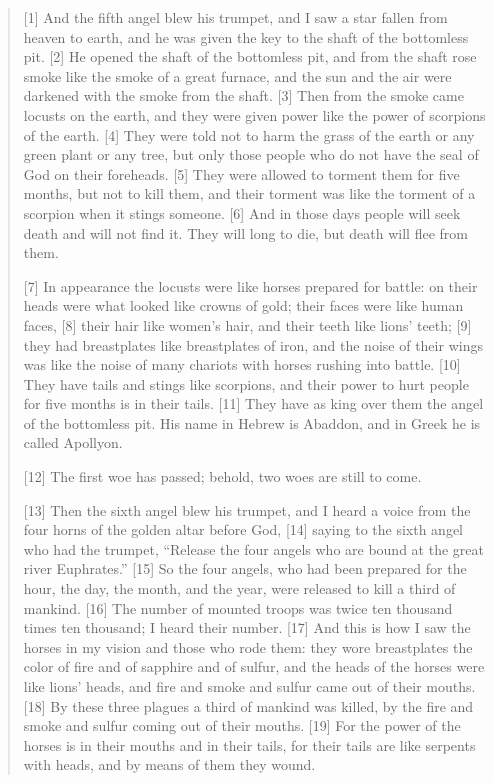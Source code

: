 \begin{quote}
    [1] And the fifth angel blew his trumpet, and I saw a star fallen from heaven to earth, and he was given the key to the shaft of the bottomless pit. [2] He opened the shaft of the bottomless pit, and from the shaft rose smoke like the smoke of a great furnace, and the sun and the air were darkened with the smoke from the shaft. [3] Then from the smoke came locusts on the earth, and they were given power like the power of scorpions of the earth. [4] They were told not to harm the grass of the earth or any green plant or any tree, but only those people who do not have the seal of God on their foreheads. [5] They were allowed to torment them for five months, but not to kill them, and their torment was like the torment of a scorpion when it stings someone. [6] And in those days people will seek death and will not find it. They will long to die, but death will flee from them.

    [7] In appearance the locusts were like horses prepared for battle: on their heads were what looked like crowns of gold; their faces were like human faces, [8] their hair like women’s hair, and their teeth like lions’ teeth; [9] they had breastplates like breastplates of iron, and the noise of their wings was like the noise of many chariots with horses rushing into battle. [10] They have tails and stings like scorpions, and their power to hurt people for five months is in their tails. [11] They have as king over them the angel of the bottomless pit. His name in Hebrew is Abaddon, and in Greek he is called Apollyon.

    [12] The first woe has passed; behold, two woes are still to come.

    [13] Then the sixth angel blew his trumpet, and I heard a voice from the four horns of the golden altar before God, [14] saying to the sixth angel who had the trumpet, “Release the four angels who are bound at the great river Euphrates.” [15] So the four angels, who had been prepared for the hour, the day, the month, and the year, were released to kill a third of mankind. [16] The number of mounted troops was twice ten thousand times ten thousand; I heard their number. [17] And this is how I saw the horses in my vision and those who rode them: they wore breastplates the color of fire and of sapphire and of sulfur, and the heads of the horses were like lions’ heads, and fire and smoke and sulfur came out of their mouths. [18] By these three plagues a third of mankind was killed, by the fire and smoke and sulfur coming out of their mouths. [19] For the power of the horses is in their mouths and in their tails, for their tails are like serpents with heads, and by means of them they wound.


\end{quote}
